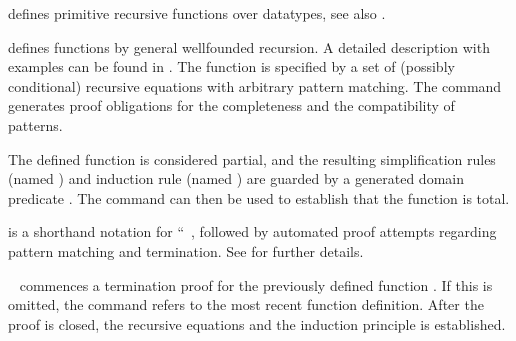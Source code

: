 \begin{isabellebody}
\begin{isamarkuptext}
  \begin{description}

  \item \hyperlink{command.HOL.primrec}{\mbox{}} defines primitive recursive
  functions over datatypes, see also \cite{isabelle-HOL}.

  \item \hyperlink{command.HOL.function}{\mbox{}} defines functions by general
  wellfounded recursion. A detailed description with examples can be
  found in \cite{isabelle-function}. The function is specified by a
  set of (possibly conditional) recursive equations with arbitrary
  pattern matching. The command generates proof obligations for the
  completeness and the compatibility of patterns.

  The defined function is considered partial, and the resulting
  simplification rules (named ) and induction rule
  (named ) are guarded by a generated domain
  predicate . The \hyperlink{command.HOL.termination}{\mbox{}}
  command can then be used to establish that the function is total.

  \item \hyperlink{command.HOL.fun}{\mbox{}} is a shorthand notation for ``\hyperlink{command.HOL.function}{\mbox{}}~, followed by automated
  proof attempts regarding pattern matching and termination.  See
  \cite{isabelle-function} for further details.

  \item \hyperlink{command.HOL.termination}{\mbox{}}~ commences a
  termination proof for the previously defined function .  If
  this is omitted, the command refers to the most recent function
  definition.  After the proof is closed, the recursive equations and
  the induction principle is established.

  \end{description}


\end{isamarkuptext}
\end{isabellebody}
